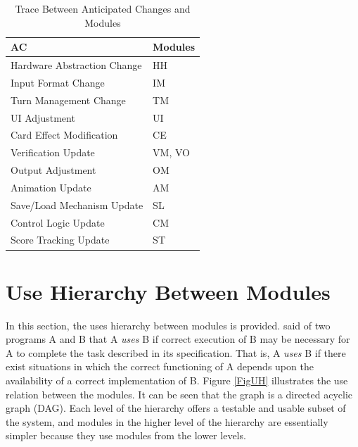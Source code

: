 \documentclass[12pt, titlepage]{article}
\begin{document}
\begin{table}[H]
\centering
\begin{tabular}{p{} p{}}
\toprule
\textbf{AC} & \textbf{Modules}\\
\midrule
Hardware Abstraction Change & HH\\
Input Format Change & IM\\
Turn Management Change & TM\\
UI Adjustment & UI\\
Card Effect Modification & CE\\
Verification Update & VM, VO\\
Output Adjustment & OM\\
Animation Update & AM\\
Save/Load Mechanism Update & SL\\
Control Logic Update & CM\\
Score Tracking Update & ST\\
\bottomrule
\end{tabular}
\caption{Trace Between Anticipated Changes and Modules}
\label{TblACT}
\end{table}



\section{Use Hierarchy Between Modules} \label{SecUse}

In this section, the uses hierarchy between modules is
provided. \citet{Parnas1978} said of two programs A and B that A {\em uses} B if
correct execution of B may be necessary for A to complete the task described in
its specification. That is, A {\em uses} B if there exist situations in which
the correct functioning of A depends upon the availability of a correct
implementation of B.  Figure \ref{FigUH} illustrates the use relation between
the modules. It can be seen that the graph is a directed acyclic graph
(DAG). Each level of the hierarchy offers a testable and usable subset of the
system, and modules in the higher level of the hierarchy are essentially simpler
because they use modules from the lower levels.

\end{document}

